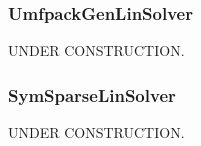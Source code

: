 \pagebreak
\subsubsection{UmfpackGenLinSolver}
UNDER CONSTRUCTION. \\

\pagebreak
\subsubsection{SymSparseLinSolver}
UNDER CONSTRUCTION. \\


%

%

